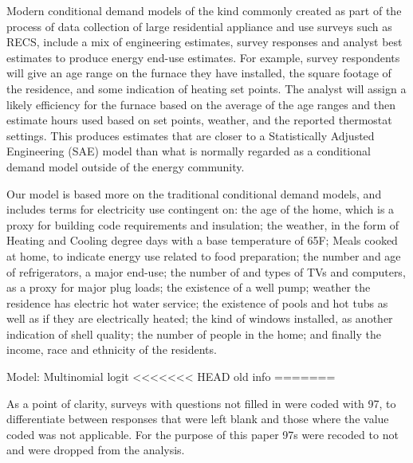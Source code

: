 \documentclass{article}
\begin{document}
  
  
Modern conditional demand models of the kind commonly created as part of the process of data collection of large residential appliance and use surveys such as RECS, include a mix of engineering estimates, survey responses and analyst best estimates to produce energy end-use estimates.  For example, survey respondents will give an age range on the furnace they have installed, the square footage of the residence, and some indication of heating set points.  The analyst will assign a likely efficiency for the furnace based on the average of the age ranges and then estimate hours used based on set points, weather, and the reported thermostat settings.  This produces estimates that are closer to a Statistically Adjusted Engineering (SAE) model than what is normally regarded as a conditional demand model outside of the energy community.

Our model is based more on the traditional conditional demand models, and includes terms for electricity use contingent on: the age of the home, which is a proxy for building code requirements and insulation; the weather, in the form of Heating and Cooling degree days with a base temperature of 65F; Meals cooked at home, to indicate energy use related to food preparation; the number and age of refrigerators, a major end-use;  the number of and types of TVs and computers, as a proxy for major plug loads; the existence of a well pump; weather the residence has electric hot water service; the existence of pools and hot tubs as well as if they are electrically heated; the kind of windows installed, as another indication of shell quality; the number of people in the home; and finally the income, race and ethnicity of the residents.  


Model: Multinomial logit
<<<<<<< HEAD
 old info  
=======

As a point of clarity, surveys with questions not filled in were coded with 97, to differentiate between responses that were left blank and those where the value coded was not applicable.  For the purpose of this paper 97s were recoded to not and were dropped from the analysis.  
\end{document}
